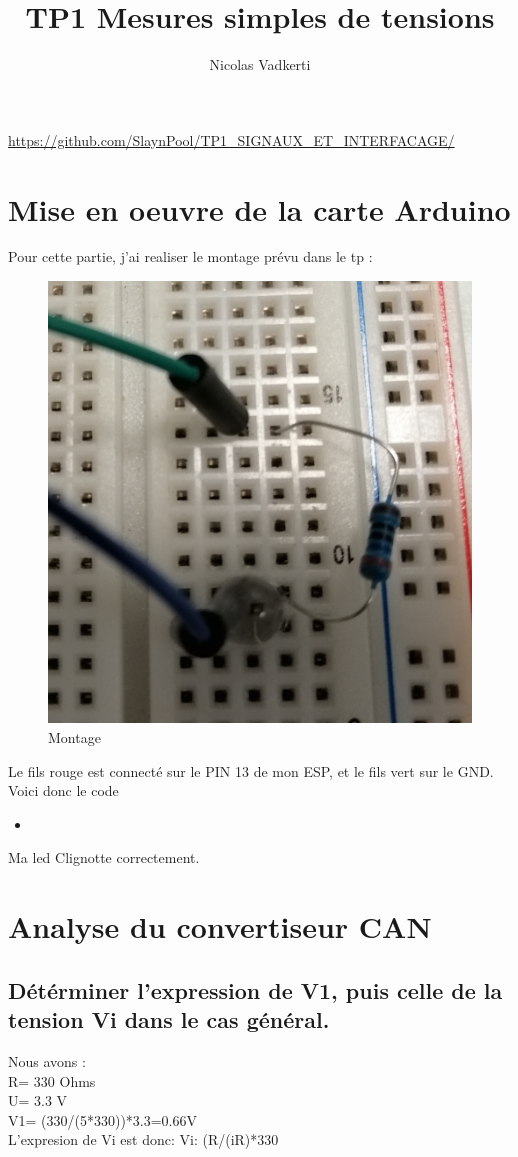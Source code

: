 \documentclass[10pt,a4paper]{article}
\title{TP1 Mesures simples de tensions}
\author{Nicolas Vadkerti}
\newcommand{\insertcode}[2]{\begin{itemize}\item[]\end{itemize}}
\begin{document}
\maketitle


\url{https://github.com/SlaynPool/TP1_SIGNAUX_ET_INTERFACAGE/}
\section{Mise en oeuvre de la carte Arduino}
Pour cette partie, j'ai realiser le montage prévu dans le tp :
\begin{figure}[h!]
\centering
\includegraphics[scale=0.20]{screen/1.jpg}
\caption{Montage}
\label{fig:net }
\end{figure}
Le fils rouge est connecté sur le PIN 13 de mon ESP, et le fils vert sur le GND.
Voici donc le code 
\insertcode{code/blink.txt}{Code 1}
Ma led Clignotte correctement.\newpage
\section{Analyse du convertiseur CAN}
\subsection{Détérminer l'expression de V1, puis celle de la tension Vi dans le cas général.}
Nous avons :\\
R= 330 Ohms\\
U= 3.3 V\\
V1= (330/(5*330))*3.3=0.66V\\
L'expresion de Vi est donc:
Vi: (R/(iR)*330
\end{document}
